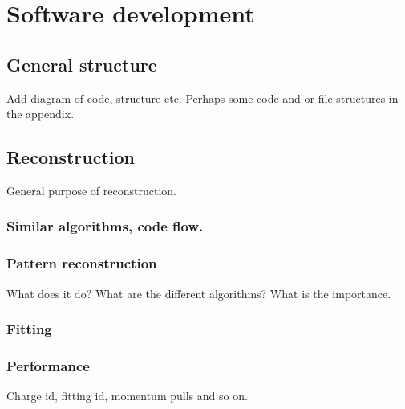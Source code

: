 \chapter{Software development}
\label{c:software}

\section{General structure}
Add diagram of code, structure etc. Perhaps some code and or file structures in the appendix.

\section{Reconstruction}
General purpose of reconstruction.

\subsection{Similar algorithms, code flow.}

\subsection{Pattern reconstruction}
What does it do? What are the different algorithms? What is the importance.

\subsection{Fitting}

\subsection{Performance}
Charge id, fitting id, momentum pulls and so on.